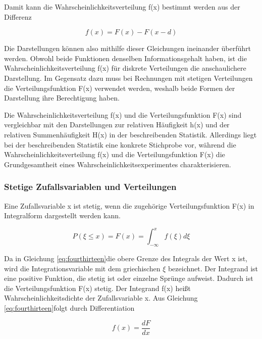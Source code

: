 \noindent Damit kann die Wahrscheinlichkeitsverteilung f(x) bestimmt werden aus der Differenz

\begin{equation}\label{eq:fourtwelve}
f\left(x\right)=F\left(x\right)-F\left(x-d\right)
\end{equation}

\noindent Die Darstellungen k\"{o}nnen also mithilfe dieser Gleichungen ineinander \"{u}berf\"{u}hrt werden. Obwohl beide Funktionen denselben Informationsgehalt haben, ist die Wahrscheinlichkeitsverteilung f(x) f\"{u}r diskrete Verteilungen die anschaulichere Darstellung. Im Gegensatz dazu muss bei Rechnungen mit stetigen Verteilungen die Verteilungsfunktion F(x) verwendet werden, weshalb beide Formen der Darstellung ihre Berechtigung haben.\newline

\noindent Die Wahrscheinlichkeitsverteilung f(x) und die Verteilungsfunktion F(x) sind vergleichbar mit den Darstellungen zur relativen H\"{a}ufigkeit h(x) und der relativen Summenh\"{a}ufigkeit H(x) in der beschreibenden Statistik. Allerdings liegt bei der beschreibenden Statistik eine konkrete Stichprobe vor, w\"{a}hrend die Wahrscheinlichkeitsverteilung f(x) und die Verteilungsfunktion F(x) die Grundgesamtheit eines Wahrscheinlichkeitsexperimentes charakterisieren. 


\subsubsection{Stetige Zufallsvariablen und Verteilungen}

\noindent Eine Zufallsvariable x ist stetig, wenn die zugeh\"{o}rige Verteilungsfunktion F(x) in Integralform dargestellt werden kann.

\begin{equation}\label{eq:fourthirteen}
P(\xi \le x)=F(x)=\int _{-\infty }^{x}f(\xi)d\xi
\end{equation}

\noindent Da in Gleichung \eqref{eq:fourthirteen}die obere Grenze des Integrals der Wert x ist, wird die Integrationsvariable mit dem griechischen $\xi$ bezeichnet. Der Integrand ist eine positive Funktion, die stetig ist oder einzelne Spr\"{u}nge aufweist. Dadurch ist die Verteilungsfunktion F(x) stetig. Der Integrand f(x) hei{\ss}t Wahrscheinlichkeitsdichte der Zufallsvariable x. Aus Gleichung \eqref{eq:fourthirteen}folgt durch Differentiation

\begin{equation}\label{eq:fourfourteen}
f(x)=\dfrac{dF}{dx}
\end{equation}


